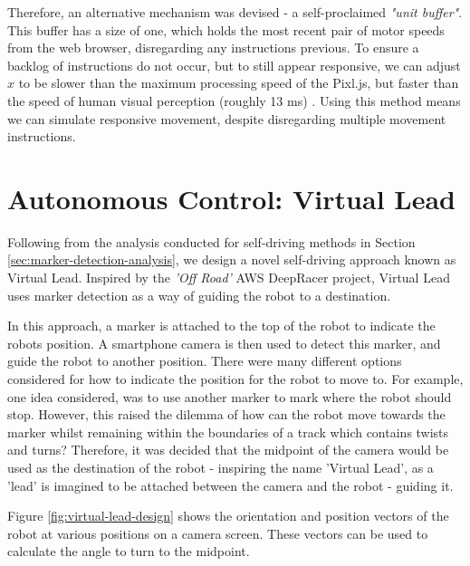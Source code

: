 \documentclass{l4proj}
\begin{document}
Therefore, an alternative mechanism was devised - a self-proclaimed \textit{"unit buffer"}. This buffer has a size of one, which holds the most recent pair of motor speeds from the web browser, disregarding any instructions previous. To ensure a backlog of instructions do not occur, but to still appear responsive, we can adjust $x$ to be slower than the maximum processing speed of the Pixl.js, but faster than the speed of human visual perception (roughly 13 ms) \citep{burger2015fast}. Using this method means we can simulate responsive movement, despite disregarding multiple movement instructions.


\section{Autonomous Control: Virtual Lead}\label{sec:virtual-lead-design}
Following from the analysis conducted for self-driving methods in Section \ref{sec:marker-detection-analysis}, we design a novel self-driving approach known as Virtual Lead. Inspired by the \textit{'Off Road'} AWS DeepRacer project, Virtual Lead uses marker detection as a way of guiding the robot to a destination.

In this approach, a marker is attached to the top of the robot to indicate the robots position. A smartphone camera is then used to detect this marker, and guide the robot to another position. There were many different options considered for how to indicate the position for the robot to move to. For example, one idea considered, was to use another marker to mark where the robot should stop. However, this raised the dilemma of how can the robot move towards the marker whilst remaining within the boundaries of a track which contains twists and turns? Therefore, it was decided that the midpoint of the camera would be used as the destination of the robot - inspiring the name 'Virtual Lead', as a 'lead' is imagined to be attached between the camera and the robot - guiding it.

Figure \ref{fig:virtual-lead-design} shows the orientation and position vectors of the robot at various positions on a camera screen. These vectors can be used to calculate the angle to turn to the midpoint.
\end{document}
